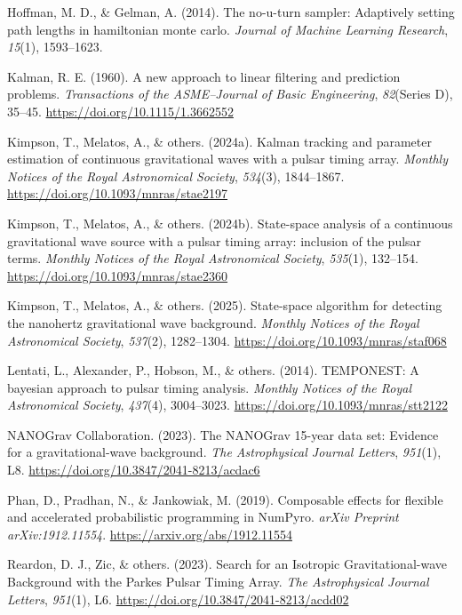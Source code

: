 \documentclass[
]{article}
\newlength{\cslhangindent}
\newenvironment{CSLReferences}[2] %
 {\begin{list}{}{%
  \setlength{\itemindent}{0pt}
  \setlength{\leftmargin}{0pt}
  \setlength{\parsep}{0pt}
  \ifodd #1
   \setlength{\leftmargin}{\cslhangindent}
   \setlength{\itemindent}{-1\cslhangindent}
  \fi
  \setlength{\itemsep}{#2\baselineskip}}}
 {\end{list}}
\begin{document}
\begin{CSLReferences}{1}{0}
Hoffman, M. D., \& Gelman, A. (2014). The no-u-turn sampler: Adaptively
setting path lengths in hamiltonian monte carlo. \emph{Journal of
Machine Learning Research}, \emph{15}(1), 1593--1623.

Kalman, R. E. (1960). A new approach to linear filtering and prediction
problems. \emph{Transactions of the ASME--Journal of Basic Engineering},
\emph{82}(Series D), 35--45. \url{https://doi.org/10.1115/1.3662552}

Kimpson, T., Melatos, A., \& others. (2024a). {Kalman tracking and
parameter estimation of continuous gravitational waves with a pulsar
timing array}. \emph{Monthly Notices of the Royal Astronomical Society},
\emph{534}(3), 1844--1867. \url{https://doi.org/10.1093/mnras/stae2197}

Kimpson, T., Melatos, A., \& others. (2024b). {State-space analysis of a
continuous gravitational wave source with a pulsar timing array:
inclusion of the pulsar terms}. \emph{Monthly Notices of the Royal
Astronomical Society}, \emph{535}(1), 132--154.
\url{https://doi.org/10.1093/mnras/stae2360}

Kimpson, T., Melatos, A., \& others. (2025). {State-space algorithm for
detecting the nanohertz gravitational wave background}. \emph{Monthly
Notices of the Royal Astronomical Society}, \emph{537}(2), 1282--1304.
\url{https://doi.org/10.1093/mnras/staf068}

Lentati, L., Alexander, P., Hobson, M., \& others. (2014). TEMPONEST: A
bayesian approach to pulsar timing analysis. \emph{Monthly Notices of
the Royal Astronomical Society}, \emph{437}(4), 3004--3023.
\url{https://doi.org/10.1093/mnras/stt2122}

NANOGrav Collaboration. (2023). The NANOGrav 15-year data set: Evidence
for a gravitational-wave background. \emph{The Astrophysical Journal
Letters}, \emph{951}(1), L8.
\url{https://doi.org/10.3847/2041-8213/acdac6}

Phan, D., Pradhan, N., \& Jankowiak, M. (2019). Composable effects for
flexible and accelerated probabilistic programming in NumPyro.
\emph{arXiv Preprint arXiv:1912.11554}.
\url{https://arxiv.org/abs/1912.11554}

Reardon, D. J., Zic, \& others. (2023). {Search for an Isotropic
Gravitational-wave Background with the Parkes Pulsar Timing Array}.
\emph{The Astrophysical Journal Letters}, \emph{951}(1), L6.
\url{https://doi.org/10.3847/2041-8213/acdd02}


\end{CSLReferences}
\end{document}
